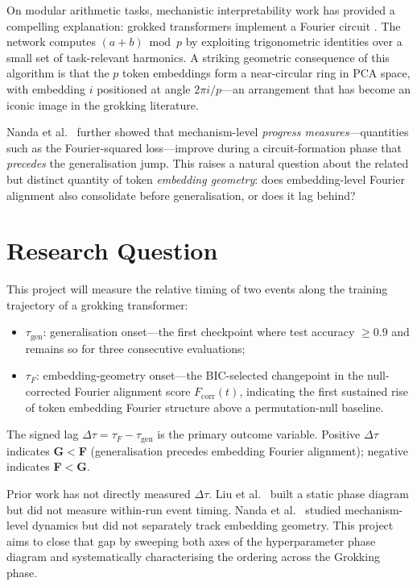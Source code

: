 \documentclass[12pt,openany,a4paper]{book}
\newcommand{\taug}{\tau_{\mathrm{gen}}}
\newcommand{\tauf}{\tau_{F}}
\newcommand{\Dtau}{\Delta\tau}
\newcommand{\fcorr}{F_{\mathrm{corr}}}
\begin{document}
On modular arithmetic tasks, mechanistic interpretability work has
provided a compelling explanation: grokked transformers implement a
Fourier circuit \cite{nanda2023progress}.
The network computes $(a+b)\bmod p$ by exploiting trigonometric
identities over a small set of task-relevant harmonics.
A striking geometric consequence of this algorithm is that the $p$
token embeddings form a near-circular ring in PCA space, with
embedding $i$ positioned at angle $2\pi i/p$---an arrangement that
has become an iconic image in the grokking literature.

Nanda et al.\ \cite{nanda2023progress} further showed that mechanism-level
\emph{progress measures}---quantities such as the Fourier-squared
loss---improve during a circuit-formation phase that \emph{precedes}
the generalisation jump.
This raises a natural question about the related but distinct quantity
of token \emph{embedding geometry}: does embedding-level Fourier
alignment also consolidate before generalisation, or does it lag behind?

\section{Research Question}

This project will measure the relative timing of two events along
the training trajectory of a grokking transformer:
\begin{itemize}
  \item $\taug$: generalisation onset---the first checkpoint where test
    accuracy $\geq 0.9$ and remains so for three consecutive evaluations;
  \item $\tauf$: embedding-geometry onset---the BIC-selected changepoint
    in the null-corrected Fourier alignment score $\fcorr(t)$, indicating
    the first sustained rise of token embedding Fourier structure above
    a permutation-null baseline.
\end{itemize}
The signed lag $\Dtau = \tauf - \taug$ is the primary outcome variable.
Positive $\Dtau$ indicates \textbf{G$<$F} (generalisation precedes
embedding Fourier alignment); negative indicates \textbf{F$<$G}.

Prior work has not directly measured $\Dtau$.
Liu et al.\ \cite{liu2022towards} built a static phase diagram but did
not measure within-run event timing.
Nanda et al.\ \cite{nanda2023progress} studied mechanism-level dynamics
but did not separately track embedding geometry.
This project aims to close that gap by sweeping both axes of the
hyperparameter phase diagram and systematically characterising the
ordering across the Grokking phase.
\end{document}

